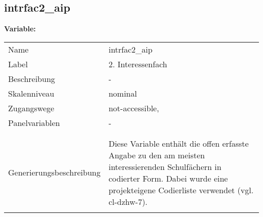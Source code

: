 	
	
	\subsection{intrfac2\_aip}
	\label{subSection:intrfac2_aip}

	\noindent\textbf{Variable:}\\
		\begin{tabular}{lL{11.3cm}}
			\label{tableVariable:intrfac2_aip}
			Name & intrfac2\_aip \\
			Label & 2. Interessenfach \\
			Beschreibung & - \\
			Skalenniveau & nominal \\
			Zugangswege &
				not-accessible,
 \\
			Panelvariablen & -
			 \\
			 \\
 \\
					Generierungsbeschreibung & Diese Variable enthält die offen erfasste Angabe zu den am meisten interessierenden Schulfächern in codierter Form. Dabei wurde eine projekteigene Codierliste verwendet (vgl. cl-dzhw-7).
				 \\	
			 \\
		\end{tabular}






	
	\newpage
